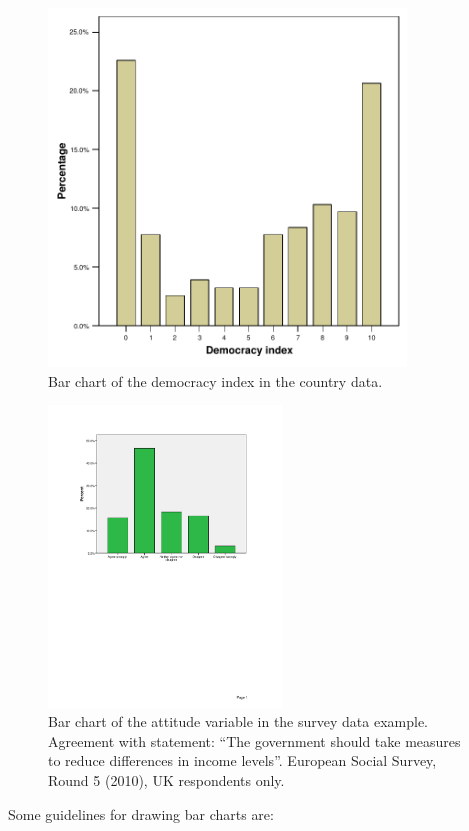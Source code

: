 \documentclass[11pt,a4paper,openany]{book}
\begin{document}
\begin{figure}[htbp]
\centering
\includegraphics[height=9.50000cm]{democ.pdf}
\caption{\label{fig:f-bars-democ} Bar chart of the democracy index in the
country data.}
\end{figure}

\begin{figure}[htbp]
\centering
\includegraphics[height=8.00000cm]{bar_attitude.pdf}
\caption{\label{fig:f-bars-attitude} Bar chart of the attitude variable in
the survey data example. Agreement with statement: ``The government
should take measures to reduce differences in income levels''. European
Social Survey, Round 5 (2010), UK respondents only.}
\end{figure}

Some guidelines for drawing bar charts are:
\end{document}
